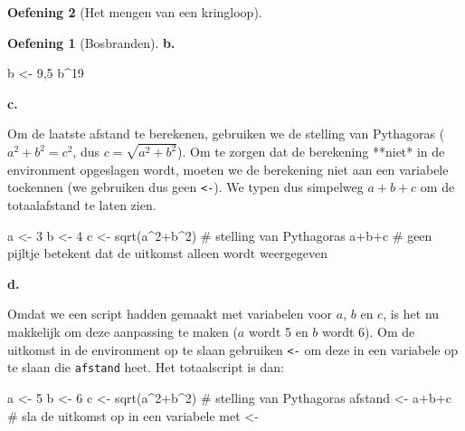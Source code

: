 \documentclass[
  a4paper,
]{scrbook}
\newenvironment{Shaded}{\begin{snugshade}}{\end{snugshade}}
\newcommand{\CommentTok}[1]{\textcolor[rgb]{0.37,0.37,0.37}{#1}}
\newcommand{\DecValTok}[1]{\textcolor[rgb]{0.68,0.00,0.00}{#1}}
\newcommand{\FunctionTok}[1]{\textcolor[rgb]{0.28,0.35,0.67}{#1}}
\newcommand{\NormalTok}[1]{\textcolor[rgb]{0.00,0.23,0.31}{#1}}
\newcommand{\OtherTok}[1]{\textcolor[rgb]{0.00,0.23,0.31}{#1}}
\newcommand{\SpecialCharTok}[1]{\textcolor[rgb]{0.37,0.37,0.37}{#1}}
\theoremstyle{definition}
\newtheorem{exercise}{Oefening}[chapter]
\theoremstyle{remark}
\begin{document}
\begin{exercise}[Het mengen van een
kringloop]
\begin{exercise}[Bosbranden]
\textbf{b. }

\begin{Shaded}
\begin{Highlighting}[]
\NormalTok{b }\OtherTok{\textless{}{-}} \DecValTok{9}\NormalTok{,}\DecValTok{5}
\NormalTok{b}\SpecialCharTok{\^{}}\DecValTok{19}
\end{Highlighting}
\end{Shaded}

\textbf{c.}

Om de laatste afstand te berekenen, gebruiken we de stelling van
Pythagoras (\(a^2+b^2=c^2\), dus \(c=\sqrt{a^2+b^2}\)). Om te zorgen dat
de berekening **niet* in de environment opgeslagen wordt, moeten we de
berekening niet aan een variabele toekennen (we gebruiken dus geen
\texttt{\textless{}-}). We typen dus simpelweg \(a+b+c\) om de
totaalafstand te laten zien.

\begin{Shaded}
\begin{Highlighting}[]
\NormalTok{a }\OtherTok{\textless{}{-}} \DecValTok{3}
\NormalTok{b }\OtherTok{\textless{}{-}} \DecValTok{4}
\NormalTok{c }\OtherTok{\textless{}{-}} \FunctionTok{sqrt}\NormalTok{(a}\SpecialCharTok{\^{}}\DecValTok{2}\SpecialCharTok{+}\NormalTok{b}\SpecialCharTok{\^{}}\DecValTok{2}\NormalTok{) }\CommentTok{\# stelling van Pythagoras}
\NormalTok{a}\SpecialCharTok{+}\NormalTok{b}\SpecialCharTok{+}\NormalTok{c }\CommentTok{\# geen pijltje betekent dat de uitkomst alleen wordt weergegeven}
\end{Highlighting}
\end{Shaded}

\textbf{d.}

Omdat we een script hadden gemaakt met variabelen voor \(a\), \(b\) en
\(c\), is het nu makkelijk om deze aanpassing te maken (\(a\) wordt 5 en
\(b\) wordt 6). Om de uitkomst in de environment op te slaan gebruiken
\texttt{\textless{}-} om deze in een variabele op te slaan die
\texttt{afstand} heet. Het totaalscript is dan:

\begin{Shaded}
\begin{Highlighting}[]
\NormalTok{a }\OtherTok{\textless{}{-}} \DecValTok{5}
\NormalTok{b }\OtherTok{\textless{}{-}} \DecValTok{6}
\NormalTok{c }\OtherTok{\textless{}{-}} \FunctionTok{sqrt}\NormalTok{(a}\SpecialCharTok{\^{}}\DecValTok{2}\SpecialCharTok{+}\NormalTok{b}\SpecialCharTok{\^{}}\DecValTok{2}\NormalTok{) }\CommentTok{\# stelling van Pythagoras}
\NormalTok{afstand }\OtherTok{\textless{}{-}}\NormalTok{ a}\SpecialCharTok{+}\NormalTok{b}\SpecialCharTok{+}\NormalTok{c }\CommentTok{\# sla de uitkomst op in een variabele met \textless{}{-}}


\end{Highlighting}
\end{Shaded}
\end{exercise}
\end{exercise}
\end{document}
